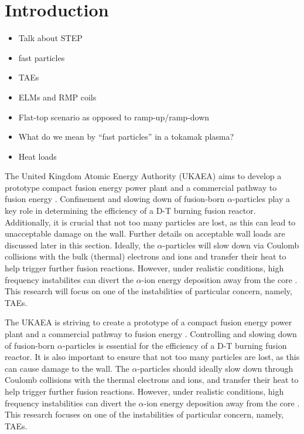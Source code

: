 \documentclass[10pt, a4paper, twoside]{article}
\begin{document}
\setlength{\parindent}{0pt}
\fontsize{10}{13}\selectfont

\section{Introduction}

\begin{itemize}
    \item Talk about STEP
    \item fast particles
    \item TAEs
    \item ELMs and RMP coils
    \item Flat-top scenario as opposed to ramp-up/ramp-down
    \item What do we mean by “fast particles” in a tokamak plasma?
    \item Heat loads
\end{itemize}

The United Kingdom Atomic Energy Authority (UKAEA) aims to develop a prototype compact fusion energy power plant and a commercial pathway to fusion energy \cite{nuttall2020, meyer2023}. Confinement and slowing down of fusion-born $\alpha$-particles play a key role in determining the efficiency of a D-T burning fusion reactor. Additionally, it is crucial that not too many particles are lost, as this can lead to unacceptable damage on the wall. Further details on acceptable wall loads are discussed later in this section. Ideally, the $\alpha$-particles will slow down via Coulomb collisions with the bulk (thermal) electrons and ions and transfer their heat to help trigger further fusion reactions.  
However, under realistic conditions, high frequency instabilites can divert the $\alpha$-ion energy deposition away from the core \cite{belova2015}. This research will focus on one of the instabilities of particular concern, namely, TAEs.

The UKAEA is striving to create a prototype of a compact fusion energy power plant and a commercial pathway to fusion energy \cite{nuttall2020, meyer2023}. Controlling and slowing down of fusion-born $\alpha$-particles is essential for the efficiency of a D-T burning fusion reactor. It is also important to ensure that not too many particles are lost, as this can cause damage to the wall. The $\alpha$-particles should ideally slow down through Coulomb collisions with the thermal electrons and ions, and transfer their heat to help trigger further fusion reactions. However, under realistic conditions, high frequency instabilities can divert the $\alpha$-ion energy deposition away from the core \cite{belova2015}. This research focuses on one of the instabilities of particular concern, namely, TAEs.
\end{document}
